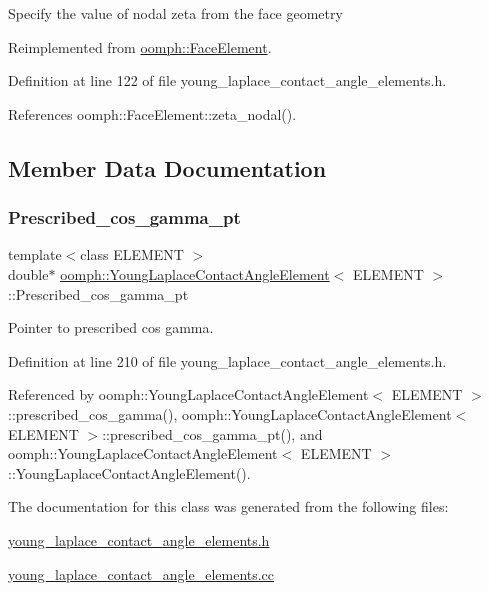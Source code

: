 Specify the value of nodal zeta from the face geometry 

Reimplemented from \hyperlink{classoomph_1_1FaceElement_a58c9f93705c7741f76c8487d152e68a6}{oomph\+::\+Face\+Element}.



Definition at line 122 of file young\+\_\+laplace\+\_\+contact\+\_\+angle\+\_\+elements.\+h.



References oomph\+::\+Face\+Element\+::zeta\+\_\+nodal().



\subsection{Member Data Documentation}
\mbox{\label{classoomph_1_1YoungLaplaceContactAngleElement_ad93443e52c595b5c69301fdf92925554}} 
\subsubsection{\texorpdfstring{Prescribed\+\_\+cos\+\_\+gamma\+\_\+pt}{Prescribed\_cos\_gamma\_pt}}
{\footnotesize\ttfamily template$<$class E\+L\+E\+M\+E\+NT $>$ \\
double$\ast$ \hyperlink{classoomph_1_1YoungLaplaceContactAngleElement}{oomph\+::\+Young\+Laplace\+Contact\+Angle\+Element}$<$ E\+L\+E\+M\+E\+NT $>$\+::Prescribed\+\_\+cos\+\_\+gamma\+\_\+pt\hspace{0.3cm}{\ttfamily [private]}}



Pointer to prescribed cos gamma. 



Definition at line 210 of file young\+\_\+laplace\+\_\+contact\+\_\+angle\+\_\+elements.\+h.



Referenced by oomph\+::\+Young\+Laplace\+Contact\+Angle\+Element$<$ E\+L\+E\+M\+E\+N\+T $>$\+::prescribed\+\_\+cos\+\_\+gamma(), oomph\+::\+Young\+Laplace\+Contact\+Angle\+Element$<$ E\+L\+E\+M\+E\+N\+T $>$\+::prescribed\+\_\+cos\+\_\+gamma\+\_\+pt(), and oomph\+::\+Young\+Laplace\+Contact\+Angle\+Element$<$ E\+L\+E\+M\+E\+N\+T $>$\+::\+Young\+Laplace\+Contact\+Angle\+Element().



The documentation for this class was generated from the following files\+:\begin{DoxyCompactItemize}
\item 
\hyperlink{young__laplace__contact__angle__elements_8h}{young\+\_\+laplace\+\_\+contact\+\_\+angle\+\_\+elements.\+h}\item 
\hyperlink{young__laplace__contact__angle__elements_8cc}{young\+\_\+laplace\+\_\+contact\+\_\+angle\+\_\+elements.\+cc}\end{DoxyCompactItemize}
